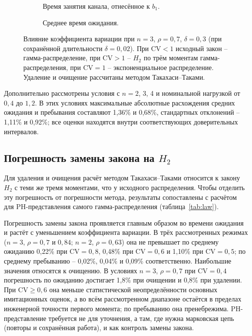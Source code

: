 \begin{figure}[!htbp]
\centering
\begin{subfigure}[t]{0.49\linewidth}
\centering
{}
\caption{Время занятия канала, отнесённое к \(b_1\).}
\label{fig:cv_occupation}
\end{subfigure}
\begin{subfigure}[t]{0.49\linewidth}
\centering
{}
\caption{Среднее время ожидания.}
\label{fig:cv_waiting}
\end{subfigure}
\caption{Влияние коэффициента вариации при \(n=3\), \(\rho=0{,}7\), \(\delta=0{,}3\) (при сохранённой длительности \(\delta=0{,}02\)). При \(\mathrm{CV}<1\) исходный закон -- гамма-распределение, при \(\mathrm{CV}>1\) -- \(H_2\) по трём моментам гамма-распределения, при \(\mathrm{CV}=1\) -- экспоненциальное распределение. Удаление и очищение рассчитаны методом Такахаси--Таками.}
\label{fig:cv}
\end{figure}

Дополнительно рассмотрены условия с \(n=2\), 3, 4 и номинальной нагрузкой от \(0{,}4\) до \(1{,}2\). В этих условиях максимальные абсолютные расхождения средних ожидания и пребывания составляют 1,36\% и 0,68\%, стандартных отклонений -- 1,11\% и 0,92\%; все оценки находятся внутри соответствующих доверительных интервалов.

\subsection{Погрешность замены закона на \(H_2\)}\label{sec:law}
Для удаления и очищения расчёт методом Такахаси--Таками относится к закону \(H_2\) с теми же тремя моментами, что у исходного распределения. Чтобы отделить эту погрешность от погрешности метода, результаты сопоставлены с расчётом для PH-представления самого гамма-распределения (таблица~\ref{tab:law}).


Погрешность замены закона проявляется главным образом во времени ожидания и растёт с уменьшением коэффициента вариации. В трёх рассмотренных режимах (\(n=3\), \(\rho=0{,}7\) и \(0{,}84\); \(n=2\), \(\rho=0{,}63\)) она не превышает по среднему ожиданию 0,22\% при \(\mathrm{CV}=0{,}8\), 0,48\% при \(\mathrm{CV}=0{,}6\) и 1,10\% при \(\mathrm{CV}=0{,}5\); по среднему пребыванию -- 0,02\%, 0,04\% и 0,09\% соответственно. Наибольшие значения относятся к очищению. В условиях \(n=3\), \(\rho=0{,}7\) при \(\mathrm{CV}=0{,}4\) погрешность по ожиданию достигает 1,8\% при очищении и 0,8\% при удалении. При \(\mathrm{CV}\ge0{,}6\) она меньше статистической неопределённости основных имитационных оценок, а во всём рассмотренном диапазоне остаётся в пределах инженерной точности первого момента; по пребыванию она пренебрежима. PH-представление требуется не для уточнения, а там, где нужна марковская цепь (повторы и сохранённая работа), и как контроль замены закона.

